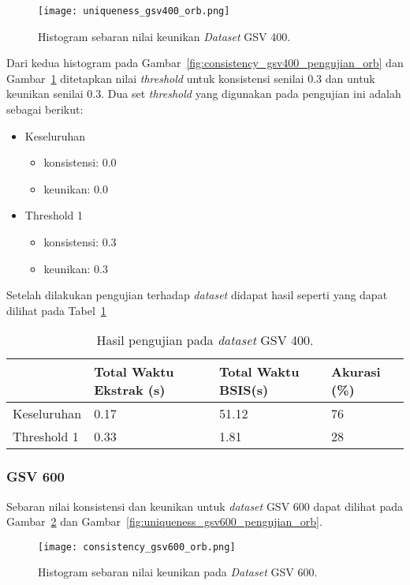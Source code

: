 \begin{figure}[H]
	\centering
	\texttt{[image: uniqueness\_gsv400\_orb.png]}
	\caption{Histogram sebaran nilai keunikan \textit{Dataset} GSV 400.}
	\label{fig:uniqueness_gsv400_pengujian_orb}
\end{figure}
Dari kedua histogram pada Gambar~\ref{fig:consistency_gsv400_pengujian_orb} dan Gambar~\ref{fig:uniqueness_gsv400_pengujian_orb} ditetapkan nilai \textit{threshold} untuk konsistensi senilai 0.3 dan untuk keunikan senilai 0.3. Dua set \textit{threshold} yang digunakan pada pengujian ini adalah sebagai berikut:
\begin{itemize}
	\item Keseluruhan
	\begin{itemize}
		\item konsistensi: 0.0
		\item keunikan: 0.0
	\end{itemize}
	\item Threshold 1
	\begin{itemize}
		\item konsistensi: 0.3
		\item keunikan: 0.3
	\end{itemize}
\end{itemize}
Setelah dilakukan pengujian terhadap \textit{dataset} didapat hasil seperti yang dapat dilihat pada Tabel~\ref{tab:pengujian_orb_gsv400}
\begin{table}[H]
	\centering
	\begin{tabular}{|l|l|l|l|}
		\hline
		& \textbf{Total Waktu Ekstrak (s)} & \textbf{Total Waktu BSIS(s)} & \textbf{Akurasi (\%)} \\ \hline
		Keseluruhan & 0.17 & 51.12                   & 76                    \\ \hline
		Threshold 1 & 0.33 & 1.81                    & 28                    \\ \hline
	\end{tabular}
	\caption{Hasil pengujian pada \textit{dataset} GSV 400.}
	\label{tab:pengujian_orb_gsv400}
\end{table}
\subsubsection{GSV 600}
Sebaran nilai konsistensi dan keunikan untuk \textit{dataset} GSV 600 dapat dilihat pada Gambar~\ref{fig:consistency_gsv600_pengujian_orb} dan Gambar~\ref{fig:uniqueness_gsv600_pengujian_orb}.
\begin{figure}[H]
	\centering
	\texttt{[image: consistency\_gsv600\_orb.png]}
	\caption{Histogram sebaran nilai keunikan pada \textit{Dataset} GSV 600.}
	\label{fig:consistency_gsv600_pengujian_orb}
\end{figure}

